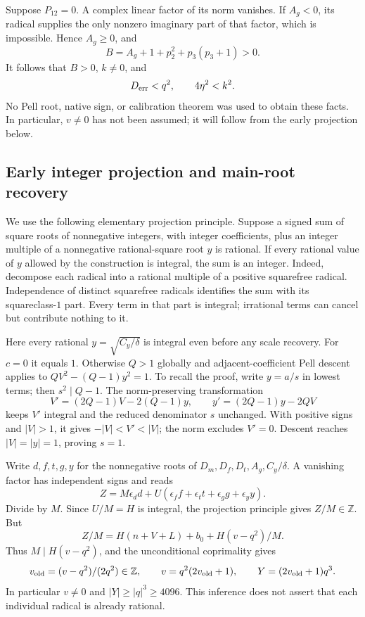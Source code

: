 Suppose $P_{12}=0$.  A complex linear factor of its norm vanishes.
If $A_g<0$, its radical supplies the only nonzero imaginary part of
that factor, which is impossible.  Hence $A_g\ge0$, and
\[
 B=A_g+1+p_2^2+p_3(p_3+1)>0.
\]
It follows that $B>0$, $k\ne0$, and
\begin{equation}
\label{eq:budget12-centered-interval}
 D_{\rm err}<q^2,\qquad 4\eta^2<k^2.
\end{equation}
No Pell root, native sign, or calibration theorem was used to obtain
these facts. In particular, $v\ne0$ has not been assumed; it will follow
from the early projection below.

\subsection{Early integer projection and main-root recovery}

We use the following elementary projection principle. Suppose a signed
sum of square roots of nonnegative integers, with integer coefficients,
plus an integer multiple of a nonnegative rational-square root $y$ is
rational. If every rational value of $y$ allowed by the construction is
integral, the sum is an integer. Indeed, decompose each radical into a
rational multiple of a positive squarefree radical. Independence of
distinct squarefree radicals identifies the sum with its squareclass-$1$
part. Every term in that part is integral; irrational terms can cancel
but contribute nothing to it.

Here every rational $y=\sqrt{C_y/\delta}$ is integral even before any
scale recovery. For $c=0$ it equals $1$. Otherwise $Q>1$ globally and
adjacent-coefficient Pell descent applies to
$QV^2-(Q-1)y^2=1$. To recall the proof, write $y=a/s$ in lowest terms;
then $s^2\mid Q-1$. The norm-preserving transformation
\[
 V'=(2Q-1)V-2(Q-1)y,\qquad
 y'=(2Q-1)y-2QV
\]
keeps $V'$ integral and the reduced denominator $s$ unchanged. With
positive signs and $|V|>1$, it gives $-|V|<V'<|V|$; the norm excludes
$V'=0$. Descent reaches $|V|=|y|=1$, proving $s=1$.

Write $d,f,t,g,y$ for the nonnegative roots of $D_m,D_f,D_t,A_g,C_y/\delta$.
A vanishing factor has independent signs and reads
\[
 Z=M\epsilon_d d+U(\epsilon_f f+\epsilon_t t+
                         \epsilon_g g+\epsilon_y y).
\]
Divide by $M$. Since $U/M=H$ is integral, the projection principle gives
$Z/M\in\mathbb Z$. But
\[
 Z/M=H(n+V+L)+b_0+H(v-q^2)/M.
\]
Thus $M\mid H(v-q^2)$, and the unconditional coprimality gives
\[
 v_{\rm old}=(v-q^2)/(2q^2)\in\mathbb Z,\qquad
 v=q^2(2v_{\rm old}+1),\qquad Y=(2v_{\rm old}+1)q^3.
\]
In particular $v\ne0$ and $|Y|\ge|q|^3\ge4096$. This inference does
not assert that each individual radical is already rational.

